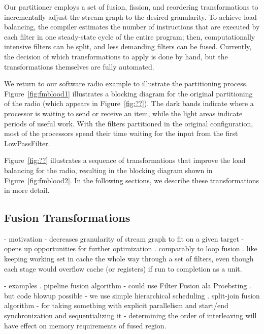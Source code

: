 Our partitioner employs a set of fusion, fission, and reordering
transformations to incrementally adjust the stream graph to the
desired granularity.  To achieve load balancing, the compiler
estimates the number of instructions that are executed by each filter
in one steady-state cycle of the entire program; then, computationally
intensive filters can be split, and less demanding filters can be
fused.  Currently, the decision of which transformations to apply is
done by hand, but the transformations themselves are fully automated.

We return to our software radio example to illustrate the partitioning
process.  Figure~\ref{fig:fmblood1} illustrates a blocking diagram for
the original partitioning of the radio (which appears in
Figure~\ref{fig:??}).  The dark bands indicate where a processor is
waiting to send or receive an item, while the light areas indicate
periods of useful work.  With the filters partitioned in the original
configuration, most of the processors spend their time waiting for the
input from the first LowPassFilter.

Figure~\ref{fig:??} illustrates a sequence of transformations that
improve the load balancing for the radio, resulting in the blocking
diagram shown in Figure~\ref{fig:fmblood2}.   In the following sections, we describe these
transformations in more detail.


\subsection{Fusion Transformations}

  - motivation
    - decreases granularity of stream graph to fit on a given target
    - opens up opportunities for further optimization
      . comparably to loop fusion
      . like keeping working set in cache the whole way through a set of
        filters, even though each stage would overflow cache (or registers)
	if run to completion as a unit.

  - examples
    . pipeline fusion algorithm
      - could use Filter Fusion ala Proebsting
        . but code blowup possible
      - we use simple hierarchical scheduling
    . split-join fusion algorithm
      - for taking something with explicit parallelism and start/end
        synchronization and sequentializing it
      - determining the order of interleaving will have effect on
        memory requirements of fused region.

